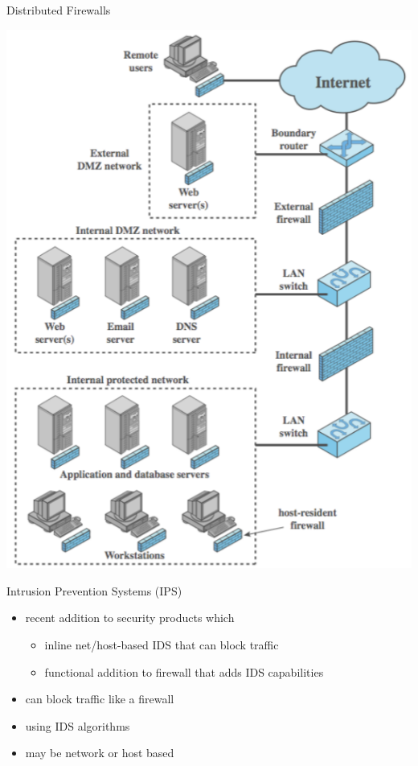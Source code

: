\documentclass{beamer}
\begin{document}
\begin{frame}{Distributed Firewalls}
  \begin{center}
    \includegraphics[width=0.5\linewidth]{distributed-firewalls}
  \end{center}
\end{frame}

\begin{frame}{Intrusion Prevention Systems (IPS)}
  \begin{itemize}
  \item recent addition to security products which 
    \begin{itemize}
    \item inline net/host-based IDS that can block traffic 
    \item functional addition to firewall that adds IDS 
      capabilities 
    \end{itemize}
  \item can block traffic like a firewall 
  \item using IDS algorithms 
  \item may be network or host based
  \end{itemize}
\end{frame}
\end{document}
